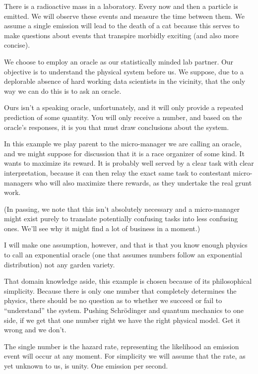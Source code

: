 There is a radioactive mass in a laboratory. Every now and then a particle is emitted. We will observe these events and measure the time between them. We assume a single emission will lead to the death of a cat because this serves to make questions about events that transpire morbidly exciting (and also more concise).

We choose to employ an oracle as our statistically minded lab partner. Our objective is to understand the physical system before us. We suppose, due to a deplorable absence of hard working data scientists in the vicinity, that the only way we can do this is to ask an oracle. 

Ours isn't a speaking oracle, unfortunately, and it will only provide a repeated prediction of some quantity. You will only receive a number, and based on the oracle's responses, it is you that must draw conclusions about the system.

In this example we play parent to the micro-manager we are calling an oracle, and we might suppose for discussion that it is a race organizer of some kind. It wants to maximize its reward. It is probably well served by a clear task with clear interpretation, because it can then relay the exact same task to contestant micro-managers who will also maximize there rewards, as they undertake the real grunt work. 

(In passing, we note that this isn't absolutely necessary and a micro-manager might exist purely to translate potentially confusing tasks into less confusing ones. We'll see why it might find a lot of business in a moment.)

I will make one assumption, however, and that is that you know enough physics to call an exponential oracle (one that assumes numbers follow an exponential distribution) not any garden variety. 

That domain knowledge aside, this example is chosen because of its philosophical simplicity. Because there is only one number that completely determines the physics, there should be no question as to whether we succeed or fail to ``understand'' the system. Pushing Schr\"odinger and quantum mechanics to one side, if we get that one number right we have the right physical model. Get it wrong and we don't.  

The single number is the hazard rate, representing the likelihood an emission event will occur at any moment. For simplicity we will assume that the rate, as yet unknown to us, is unity. One emission per second. 

